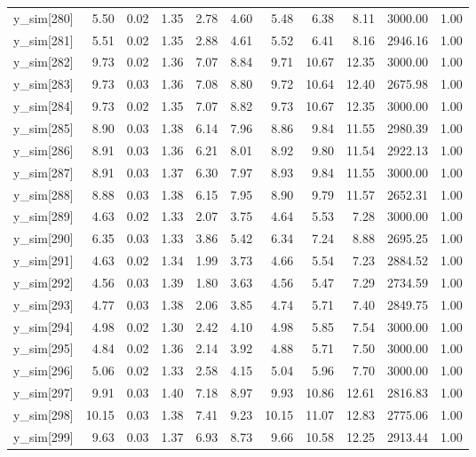 \begin{table}[ht]
\begin{tabular}{rrrrrrrrrrr}
  y\_sim[280] & 5.50 & 0.02 & 1.35 & 2.78 & 4.60 & 5.48 & 6.38 & 8.11 & 3000.00 & 1.00 \\ 
  y\_sim[281] & 5.51 & 0.02 & 1.35 & 2.88 & 4.61 & 5.52 & 6.41 & 8.16 & 2946.16 & 1.00 \\ 
  y\_sim[282] & 9.73 & 0.02 & 1.36 & 7.07 & 8.84 & 9.71 & 10.67 & 12.35 & 3000.00 & 1.00 \\ 
  y\_sim[283] & 9.73 & 0.03 & 1.36 & 7.08 & 8.80 & 9.72 & 10.64 & 12.40 & 2675.98 & 1.00 \\ 
  y\_sim[284] & 9.73 & 0.02 & 1.35 & 7.07 & 8.82 & 9.73 & 10.67 & 12.35 & 3000.00 & 1.00 \\ 
  y\_sim[285] & 8.90 & 0.03 & 1.38 & 6.14 & 7.96 & 8.86 & 9.84 & 11.55 & 2980.39 & 1.00 \\ 
  y\_sim[286] & 8.91 & 0.03 & 1.36 & 6.21 & 8.01 & 8.92 & 9.80 & 11.54 & 2922.13 & 1.00 \\ 
  y\_sim[287] & 8.91 & 0.03 & 1.37 & 6.30 & 7.97 & 8.93 & 9.84 & 11.55 & 3000.00 & 1.00 \\ 
  y\_sim[288] & 8.88 & 0.03 & 1.38 & 6.15 & 7.95 & 8.90 & 9.79 & 11.57 & 2652.31 & 1.00 \\ 
  y\_sim[289] & 4.63 & 0.02 & 1.33 & 2.07 & 3.75 & 4.64 & 5.53 & 7.28 & 3000.00 & 1.00 \\ 
  y\_sim[290] & 6.35 & 0.03 & 1.33 & 3.86 & 5.42 & 6.34 & 7.24 & 8.88 & 2695.25 & 1.00 \\ 
  y\_sim[291] & 4.63 & 0.02 & 1.34 & 1.99 & 3.73 & 4.66 & 5.54 & 7.23 & 2884.52 & 1.00 \\ 
  y\_sim[292] & 4.56 & 0.03 & 1.39 & 1.80 & 3.63 & 4.56 & 5.47 & 7.29 & 2734.59 & 1.00 \\ 
  y\_sim[293] & 4.77 & 0.03 & 1.38 & 2.06 & 3.85 & 4.74 & 5.71 & 7.40 & 2849.75 & 1.00 \\ 
  y\_sim[294] & 4.98 & 0.02 & 1.30 & 2.42 & 4.10 & 4.98 & 5.85 & 7.54 & 3000.00 & 1.00 \\ 
  y\_sim[295] & 4.84 & 0.02 & 1.36 & 2.14 & 3.92 & 4.88 & 5.71 & 7.50 & 3000.00 & 1.00 \\ 
  y\_sim[296] & 5.06 & 0.02 & 1.33 & 2.58 & 4.15 & 5.04 & 5.96 & 7.70 & 3000.00 & 1.00 \\ 
  y\_sim[297] & 9.91 & 0.03 & 1.40 & 7.18 & 8.97 & 9.93 & 10.86 & 12.61 & 2816.83 & 1.00 \\ 
  y\_sim[298] & 10.15 & 0.03 & 1.38 & 7.41 & 9.23 & 10.15 & 11.07 & 12.83 & 2775.06 & 1.00 \\ 
  y\_sim[299] & 9.63 & 0.03 & 1.37 & 6.93 & 8.73 & 9.66 & 10.58 & 12.25 & 2913.44 & 1.00 \\ 

\end{tabular}
\end{table}
